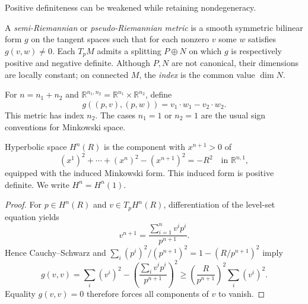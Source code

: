 Positive definiteness can be weakened while retaining nondegeneracy.

\begin{definition}
  \label{def:pet-ch1-pseudo-riemannian}
  \leanok
  A \emph{semi-Riemannian} or \emph{pseudo-Riemannian metric} is a smooth
  symmetric bilinear form $g$ on the tangent spaces such that for each nonzero
  $v$ some $w$ satisfies $g(v,w)\ne0$. Each $T_pM$ admits a splitting
  $P\oplus N$ on which $g$ is respectively positive and negative definite.
  Although $P,N$ are not canonical, their dimensions are locally constant;
  on connected $M$, the \emph{index} is the common value $\dim N$.
\end{definition}

\begin{example}
  \label{ex:pet-ch1-minkowski}
  \leanok
  For $n=n_1+n_2$ and
  $\mathbb{R}^{n_1,n_2}=\mathbb{R}^{n_1}\times\mathbb{R}^{n_2}$, define
  \[
    g((p,v),(p,w))=v_1\cdot w_1-v_2\cdot w_2.
  \]
  This metric has index $n_2$. The cases $n_1=1$ or $n_2=1$ are the usual
  sign conventions for Minkowski space.
\end{example}

\begin{example}
  \label{ex:pet-ch1-hyperbolic-space}
  \leanok
  Hyperbolic space $H^n(R)$ is the component with $x^{n+1}>0$ of
  \[
    (x^1)^2+\cdots+(x^n)^2-(x^{n+1})^2=-R^2
      \quad\text{in }\mathbb{R}^{n,1},
  \]
  equipped with the induced Minkowski form. This induced form is positive
  definite. We write $H^n=H^n(1)$.
\end{example}
\begin{proof}
  \leanok
  \sketch
  For $p\in H^n(R)$ and $v\in T_pH^n(R)$, differentiation of the level-set
  equation yields
  \[
    v^{n+1}=\frac{\sum_{i=1}^n v^ip^i}{p^{n+1}}.
  \]
  Hence Cauchy--Schwarz and
  $\sum_i(p^i)^2/(p^{n+1})^2=1-(R/p^{n+1})^2$ imply
  \[
    g(v,v)=\sum_i(v^i)^2-
      \left(\frac{\sum_i v^ip^i}{p^{n+1}}\right)^2
      \ge \left(\frac{R}{p^{n+1}}\right)^2\sum_i(v^i)^2.
  \]
  Equality $g(v,v)=0$ therefore forces all components of $v$ to vanish.
\end{proof}

